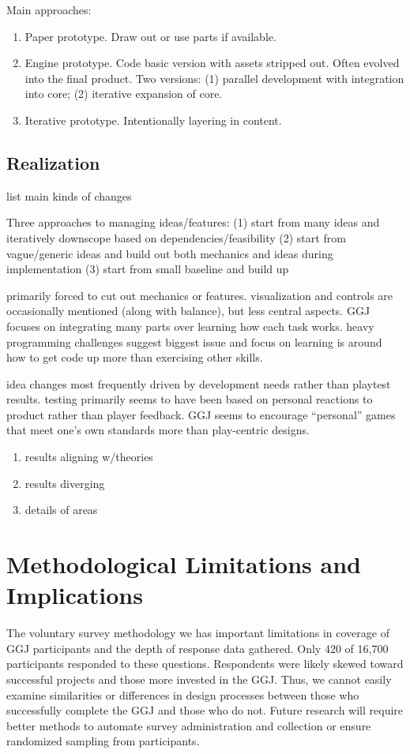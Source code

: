 \documentclass{sig-alternate}
\begin{document}
Main approaches:
\begin{enumerate}
\item Paper prototype. Draw out or use parts if available.
\item Engine prototype. Code basic version with assets stripped out. Often evolved into the final product. Two versions: (1) parallel development with integration into core; (2) iterative expansion of core.
\item Iterative prototype. Intentionally layering in content.
\end{enumerate}

\subsection{Realization}
list main kinds of changes

Three approaches to managing ideas/features: 
(1) start from many ideas and iteratively downscope based on dependencies/feasibility
(2) start from vague/generic ideas and build out both mechanics and ideas during implementation
(3) start from small baseline and build up

primarily forced to cut out mechanics or features. visualization and controls are occasionally mentioned (along with balance), but less central aspects. GGJ focuses on integrating many parts over learning how each task works. heavy programming challenges suggest biggest issue and focus on learning is around how to get code up more than exercising other skills.

idea changes most frequently driven by development needs rather than playtest results. testing primarily seems to have been based on personal reactions to product rather than player feedback. GGJ seems to encourage ``personal'' games that meet one's own standards more than play-centric designs. 

\begin{enumerate}
\item results aligning w/theories
\item results diverging
\item details of areas
\end{enumerate}

\section{Methodological Limitations and Implications}
The voluntary survey methodology we has important limitations in coverage of GGJ participants and the depth of response data gathered. Only 420 of 16,700 participants responded to these questions. Respondents were likely skewed toward successful projects and those more invested in the GGJ. Thus, we cannot easily examine similarities or differences in design processes between those who successfully complete the GGJ and those who do not. Future research will require better methods to automate survey administration and collection or ensure randomized sampling from participants.
\end{document}

